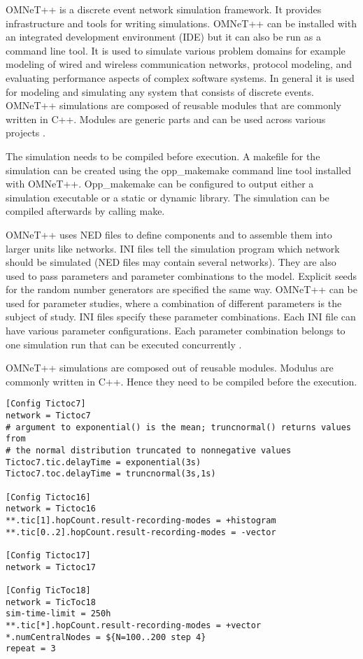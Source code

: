 OMNeT++ is a discrete event network simulation framework. It provides infrastructure and tools for writing simulations. OMNeT++ can be installed with an integrated development environment (IDE) but it can also be run as a command line tool. It is used to simulate various problem domains for example modeling of wired and wireless communication networks, protocol modeling, and evaluating performance aspects of complex software systems. In general it is used for modeling and simulating any system that consists of discrete events. OMNeT++ simulations are composed of reusable modules that are commonly written in C++. Modules are generic parts and can be used across various projects \cite{oppSimulationManual5.6.1}.

The simulation needs to be compiled before execution. A makefile for the simulation can be created using the opp\_makemake command line tool installed with OMNeT++. Opp\_makemake can be configured to output either a simulation executable or a static or dynamic library. The simulation can be compiled afterwards by calling make.

OMNeT++ uses NED files to define components and to assemble them into larger units like networks. INI files tell the simulation program which network should be simulated (NED files may contain several networks). They are also used to pass parameters and parameter combinations to the model. Explicit seeds for the random number generators are specified the same way. OMNeT++ can be used for parameter studies, where a combination of different parameters is the subject of study. INI files specify these parameter combinations. Each INI file can have various parameter configurations. Each parameter combination belongs to one simulation run that can be executed concurrently \cite{omnetpp:tictoc}.

OMNeT++ simulations are composed out of reusable modules. Modulus are commonly written in C++. Hence they need to be compiled before the execution.

\begin{lstlisting}[caption=Example INI file]
[Config Tictoc7]
network = Tictoc7
# argument to exponential() is the mean; truncnormal() returns values from
# the normal distribution truncated to nonnegative values
Tictoc7.tic.delayTime = exponential(3s)
Tictoc7.toc.delayTime = truncnormal(3s,1s)

[Config Tictoc16]
network = Tictoc16
**.tic[1].hopCount.result-recording-modes = +histogram
**.tic[0..2].hopCount.result-recording-modes = -vector

[Config Tictoc17]
network = Tictoc17

[Config TicToc18]
network = TicToc18
sim-time-limit = 250h
**.tic[*].hopCount.result-recording-modes = +vector
*.numCentralNodes = ${N=100..200 step 4}
repeat = 3
\end{lstlisting}

